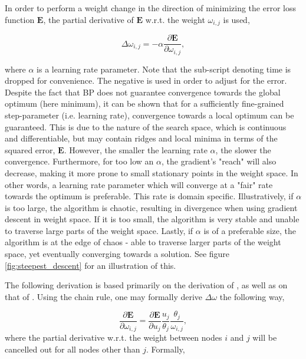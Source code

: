 In order to perform a weight change in the direction of minimizing the error loss function $\textbf{E}$, the partial derivative of $\textbf{E}$ w.r.t. the weight $\omega_{i,j}$ is used,

\begin{equation}
    \Delta \omega_{i,j} = -\alpha \frac{\partial \textbf{E}}{\partial \omega_{i,j}},
\end{equation}

where $\alpha$ is a learning rate parameter. Note that the sub-script denoting time is dropped for convenience.
The negative is used in order to adjust for the error. Despite the fact that BP does not guarantee convergence towards the global optimum (here minimum), it can be shown that for a sufficiently fine-grained step-parameter (i.e. learning rate), convergence towards a local optimum can be guaranteed. This is due to the nature of the search space, which is continuous and differentiable, but may contain ridges and local minima in terms of the squared error, $\textbf{E}$. However, the smaller the learning rate $\alpha$, the slower the convergence. Furthermore, for too low an $\alpha$, the gradient's "reach" will also decrease, making it more prone to small stationary points in the weight space. In other words, a learning rate parameter which will converge at a "fair" rate towards the optimum is preferable. This rate is domain specific. Illustratively, if $\alpha$ is too large, the algorithm is chaotic, resulting in divergence when using gradient descent in weight space. If it is too small, the algorithm is very stable and unable to traverse large parts of the weight space. Lastly, if $\alpha$ is of a preferable size, the algorithm is at the edge of chaos - able to traverse larger parts of the weight space, yet eventually converging towards a solution. See figure \ref{fig:steepest_descent} for an illustration of this.

The following derivation is based primarily on the derivation of \cite{Rumelhart1986}, as well as on that of \cite{Russell2009}.
Using the chain rule, one may formally derive $\Delta \omega$ the following way,

\begin{equation}
    \frac{\partial \textbf{E}}{\partial \omega_{i,j}} = \frac{\partial \textbf{E}}{\partial u_j}
    \frac{u_j}{\theta_{j}}
    \frac{\theta_{j}}{\omega_{i,j}},
\end{equation}
where the partial derivative w.r.t. the weight between nodes $i$ and $j$ will be cancelled out for all nodes other than $j$. Formally,


